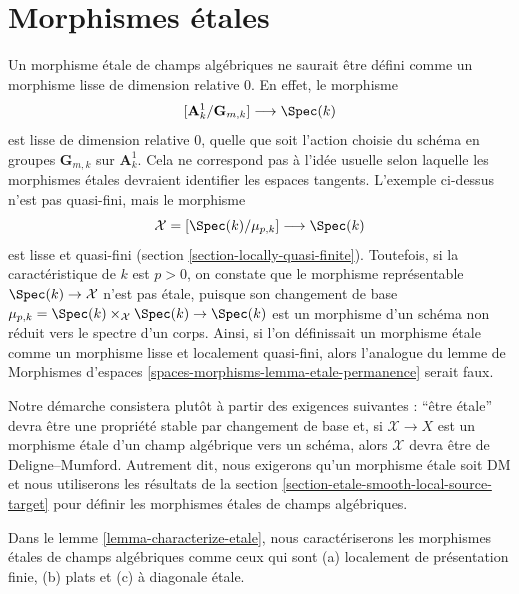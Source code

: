 \section{Morphismes \'etales}
\label{section-etale}

\noindent
Un morphisme \'etale de champs alg\'ebriques ne saurait \^etre d\'efini comme un
morphisme lisse de dimension relative $0$. En effet, le morphisme
$$
[\mathbf{A}^1_k/\mathbf{G}_{m, k}] \longrightarrow \Spec(k)
$$
est lisse de dimension relative $0$, quelle que soit l'action choisie
du sch\'ema en groupes $\mathbf{G}_{m, k}$ sur $\mathbf{A}^1_k$.
Cela ne correspond pas \`a l'id\'ee usuelle selon laquelle les morphismes \'etales
devraient identifier les espaces tangents. L'exemple ci-dessus n'est pas quasi-fini,
mais le morphisme
$$
\mathcal{X} = [\Spec(k)/\mu_{p, k}] \longrightarrow \Spec(k)
$$
est lisse et quasi-fini (section \ref{section-locally-quasi-finite}).
Toutefois, si la caract\'eristique de $k$ est $p > 0$, on constate
que le morphisme repr\'esentable $\Spec(k) \to \mathcal{X}$
n'est pas \'etale, puisque son changement de base
$\mu_{p, k} = \Spec(k) \times_\mathcal{X} \Spec(k) \to \Spec(k)$
est un morphisme d'un sch\'ema non r\'eduit vers le spectre d'un corps.
Ainsi, si l'on d\'efinissait un morphisme \'etale comme un morphisme lisse et localement quasi-fini,
alors l'analogue du lemme de Morphismes d'espaces
\ref{spaces-morphisms-lemma-etale-permanence} serait faux.

\medskip\noindent
Notre d\'emarche consistera plut\^ot \`a partir des exigences suivantes :
``\^etre \'etale'' devra \^etre une propri\'et\'e stable par changement de base et, si
$\mathcal{X} \to X$ est un morphisme \'etale d'un champ alg\'ebrique
vers un sch\'ema, alors $\mathcal{X}$ devra \^etre de Deligne--Mumford.
Autrement dit, nous exigerons qu'un morphisme \'etale soit DM et
nous utiliserons les r\'esultats de la
section \ref{section-etale-smooth-local-source-target} pour d\'efinir
les morphismes \'etales de champs alg\'ebriques.

\medskip\noindent
Dans le lemme \ref{lemma-characterize-etale}, nous caract\'eriserons
les morphismes \'etales de champs alg\'ebriques comme ceux qui sont
(a) localement de pr\'esentation finie,
(b) plats et (c) \`a diagonale \'etale.

